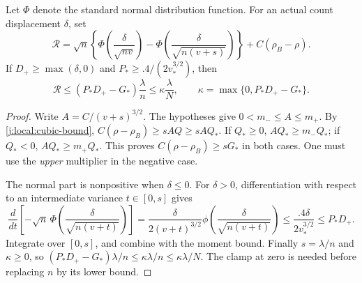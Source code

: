 \begin{proposition}\label{j:local:repair}
Let $\Phi$ denote the standard normal distribution function. For an actual
count displacement $\delta$, set
\[
 \mathcal R=\sqrt n\left\{
 \Phi\!\left(\frac{\delta}{\sqrt{nv}}\right)
 -\Phi\!\left(\frac{\delta}{\sqrt{n(v+s)}}\right)\right\}
                         +C(\rho_B-\rho).
\]
If $D_+\ge\max(\delta,0)$ and $P_*\ge .4/(2v_*^{3/2})$, then
\begin{equation}\label{j:local:repair_bound}
 \mathcal R\le(P_*D_+-G_*)\frac{\lambda}{n}
 \le \kappa\frac{\lambda}{N},\qquad
 \kappa=\max\{0,P_*D_+-G_*\}.
\end{equation}
\end{proposition}
\begin{proof}
Write $A=C/(v+s)^{3/2}$. The hypotheses give
$0<m_-\le A\le m_+$. By \eqref{j:local:cubic-bound},
$C(\rho-\rho_B)\ge sAQ\ge sAQ_*$.
If $Q_*\ge0$, $AQ_*\ge m_-Q_*$; if $Q_*<0$,
$AQ_*\ge m_+Q_*$. This proves $C(\rho-\rho_B)\ge sG_*$
in both cases. One must use the \emph{upper} multiplier in the negative
case.

The normal part is nonpositive when $\delta\le0$.
For $\delta>0$, differentiation with respect to an intermediate variance
$t\in[0,s]$ gives
\[
 \frac{d}{dt}\left[-\sqrt n\,
 \Phi\!\left(\frac{\delta}{\sqrt{n(v+t)}}\right)\right]
 =\frac{\delta}{2(v+t)^{3/2}}
   \phi\!\left(\frac{\delta}{\sqrt{n(v+t)}}\right)
 \le\frac{.4\delta}{2v_*^{3/2}}\le P_*D_+.
\]
Integrate over $[0,s]$, and combine with the moment bound.
Finally $s=\lambda/n$ and $\kappa\ge0$, so
$(P_*D_+-G_*)\lambda/n\le\kappa\lambda/n\le\kappa\lambda/N$.
The clamp at zero is needed before replacing $n$ by its lower bound.
\end{proof}



